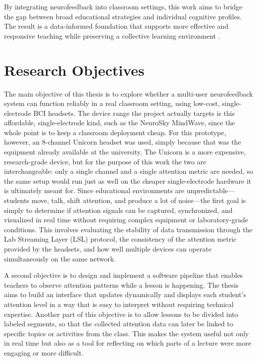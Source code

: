 By integrating neurofeedback into classroom settings, this work aims to bridge the
gap between broad educational strategies and individual cognitive profiles. The
result is a data-informed foundation that supports more effective and responsive
teaching while preserving a collective learning environment \cite{Marzbani2016}.

\section{Research Objectives}\label{sect:robj}
The main objective of this thesis is to explore whether a multi-user neurofeedback system can function reliably in a real classroom setting, using low-cost, single-electrode BCI headsets. The device range the project actually targets is this affordable, single-electrode kind, such as the NeuroSky MindWave, since the whole point is to keep a classroom deployment cheap. For this prototype, however, an 8-channel Unicorn headset was used, simply because that was the equipment already available at the university. The Unicorn is a more expensive, research-grade device, but for the purpose of this work the two are interchangeable: only a single channel and a single attention metric are needed, so the same setup would run just as well on the cheaper single-electrode hardware it is ultimately meant for. Since educational environments are unpredictable—students move, talk, shift attention, and produce a lot of noise—the first goal is simply to determine if attention signals can be captured, synchronized, and visualized in real time without requiring complex equipment or laboratory-grade conditions. This involves evaluating the stability of data transmission through the Lab Streaming Layer (LSL) protocol, the consistency of the attention metric provided by the headsets, and how well multiple devices can operate simultaneously on the same network.


A second objective is to design and implement a software pipeline that enables teachers to observe attention patterns while a lesson is happening. The thesis aims to build an interface that updates dynamically and displays each student’s attention level in a way that is easy to interpret without requiring technical expertise. Another part of this objective is to allow lessons to be divided into labeled segments, so that the collected attention data can later be linked to specific topics or activities from the class. This makes the system useful not only in real time but also as a tool for reflecting on which parts of a lecture were more engaging or more difficult.


